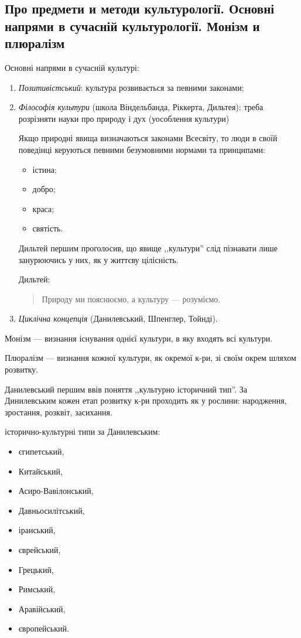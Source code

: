 \documentclass[a5paper,10pt,titlepage,pdftex,headsepline]{scrartcl}
\begin{document}
\subsection{Про предмети и методи культурології. Основні напрями в сучасній культурології. Монізм и плюралізм}
Основні напрями в сучасній культурі:
\begin{enumerate}
  \item \textit{Позитивістський}: культура розвивається за певними законами;
  \item \textit{Філософія культури} (школа Віндельбанда, Ріккерта, Дильтея): треба розрізняти науки про природу і дух (уособлення культури)

Якщо природні явища визначаються законами Всесвіту, то люди в своїй поведінці  керуються певними безумовними нормами та принципами:
\begin{itemize}
\item істина;
\item добро;
\item краса;
\item святість.
\end{itemize}

Дильтей першим проголосив, що явище ,,культури'' слід пізнавати лише занурюючись у них, як у життєву цілісність.

Дильтей:
\begin{quote}
  Природу ми пояснюємо, а культуру --- розуміємо.
\end{quote}

  \item \textit{Циклічна концепція} (Данилевський, Шпенглер, Тойнді).
\end{enumerate}

Монізм --- визнання існування однієї культури, в яку входять всі культури.

Плюралізм --- визнання кожної культури, як окремої к-ри, зі своїм окрем шляхом розвитку.

Данилевський першим ввів поняття ,,культурно історичний тип''.
За Динилевським кожен етап розвитку к-ри проходить як у рослини: народження, зростання, розквіт, засихання.

історично-культурні типи за Данилевським:
\begin{itemize}
  \item єгипетський,
  \item Китайський,
  \item Асиро-Вавілонський,
  \item Давньосилітський,
  \item іранський,
  \item єврейський,
  \item Грецький,
  \item Римський,
  \item Аравійський,
  \item європейський.
\end{itemize}
\end{document}
